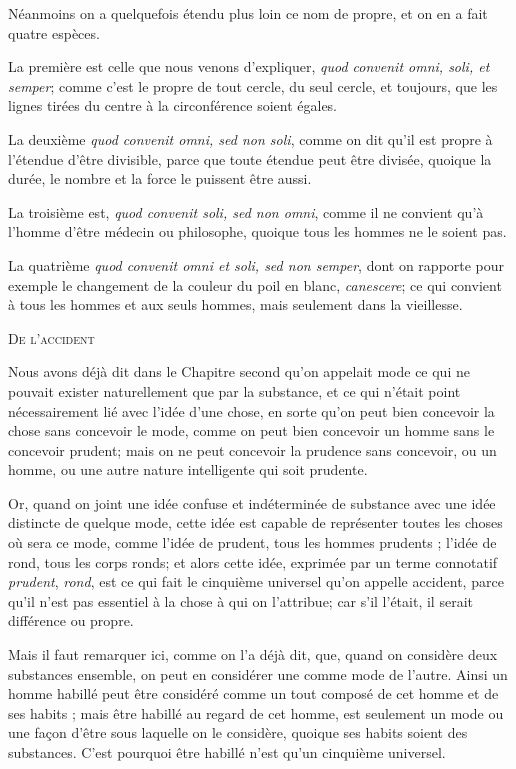 Néanmoins on a quelquefois étendu plus loin ce nom de propre, et on en a fait quatre espèces.

La première est celle que nous venons d'expliquer, \emph{quod convenit omni, soli, et semper}; comme c'est le propre de tout cercle, du seul cercle, et toujours, que les lignes tirées du centre à la circonférence soient égales.

La deuxième \emph{quod convenit omni, sed non soli}, comme on dit qu'il est propre à l'étendue d'être divisible, parce que toute étendue peut être divisée, quoique la durée, le nombre et la force le puissent être aussi.

La troisième est, \emph{quod convenit soli, sed non omni}, comme il ne convient qu'à l'homme d'être médecin ou philosophe, quoique tous les hommes ne le soient pas.

La quatrième \emph{quod convenit omni et soli, sed non semper}, dont on rapporte pour exemple le changement de la couleur du poil en blanc, \emph{canescere}; ce qui convient à tous les hommes et aux seuls hommes, mais seulement dans la vieillesse.

\begin{center}{\large\scshape De l'accident}\end{center}

Nous avons déjà dit dans le Chapitre second qu'on appelait mode ce qui ne pouvait exister naturellement que par la substance, et ce qui n'était point nécessairement lié avec l'idée d'une chose, en sorte qu'on peut bien concevoir la chose sans concevoir le mode, comme on peut bien concevoir un homme sans le concevoir prudent; mais on ne peut concevoir la prudence sans concevoir, ou un homme, ou une autre nature intelligente qui soit prudente.

Or, quand on joint une idée confuse et indéterminée de substance avec une idée distincte de quelque mode, cette idée est capable de représenter toutes les choses où sera ce mode, comme l'idée de prudent, tous les hommes prudents ; l'idée de rond, tous les corps ronds; et alors cette idée, exprimée par un terme connotatif \emph{prudent}, \emph{rond}, est ce qui fait le cinquième universel qu'on appelle accident, parce qu'il n'est pas essentiel à la chose à qui on l'attribue; car s'il l'était, il serait différence ou propre.

Mais il faut remarquer ici, comme on l'a déjà dit, que, quand on considère deux substances ensemble, on peut en considérer une comme mode de l'autre. Ainsi un homme habillé peut être considéré comme un tout composé de cet homme et de ses habits ; mais être habillé au regard de cet homme, est seulement un mode ou une façon d'être sous laquelle on le considère, quoique ses habits soient des substances. C'est pourquoi être habillé n'est qu'un cinquième universel.

